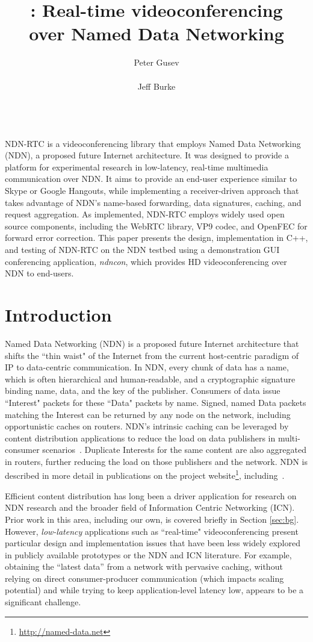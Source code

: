 \documentclass{icn/sig-alternate-2013} %
\title{\ndnrtcName{}: Real-time videoconferencing\\ over Named Data Networking}
\author{
\alignauthor Peter Gusev\\
       \affaddr{UCLA REMAP}\\
       \email{peter@remap.ucla.edu}
\alignauthor Jeff Burke\\
       \affaddr{UCLA REMAP}\\
       \email{jburke@remap.ucla.edu}
}
\newcommand{\ndnrtcName}{NDN-RTC} %
\newcommand{\ndnconName}{\emph{ndncon}}
\begin{document}
\maketitle

\abstract
\ndnrtcName{} is a videoconferencing library that employs Named Data Networking (NDN), a proposed future Internet architecture. It was designed to 
provide a platform for experimental research in low-latency, real-time multimedia communication over NDN. It aims to provide an end-user experience similar to Skype or Google Hangouts, while implementing a receiver-driven approach that takes advantage of NDN's name-based forwarding, data signatures, caching, and request aggregation.  As implemented, \ndnrtcName{} employs widely used open source components, including the WebRTC library, VP9 codec, and OpenFEC for forward error correction. This paper presents the design, implementation in C++, and testing of \ndnrtcName{} on the NDN testbed using a demonstration GUI conferencing application, \ndnconName{}, which provides HD videoconferencing over NDN to end-users. 
\section{Introduction}
Named Data Networking (NDN) is a proposed future Internet architecture that shifts the ``thin waist" of the Internet from the current host-centric paradigm of IP to data-centric communication. In NDN, every chunk of data has a name, which is often hierarchical and human-readable, and a cryptographic signature binding name, data, and the key of the publisher.  Consumers of data issue ``Interest" packets for these ``Data" packets by name. Signed, named Data packets matching the Interest can be returned by any node on the network, including opportunistic caches on routers. NDN's intrinsic caching can be leveraged by content distribution applications to reduce the load on data publishers in multi-consumer scenarios~\cite{ndnvideo}. Duplicate Interests for the same content are also aggregated in routers, further reducing the load on those publishers and the network. NDN is described in more detail in publications on the project website\footnote{\url{http://named-data.net}}, including~\cite{ndntechreport, ndntechreport0, ndn-netw}.

Efficient content distribution has long been a driver application for research on NDN research and the broader field of Information Centric Networking (ICN). Prior work in this area, including our own, is covered briefly in Section \ref{sec:bg}.  However, \emph{low-latency} applications such as ``real-time" videoconferencing present particular design and implementation issues that have been less widely explored in publicly available prototypes or the NDN and ICN literature. For example, obtaining the ``latest data'' from a network with pervasive caching, without relying on direct consumer-producer communication (which impacts scaling potential) and while trying to keep application-level latency low, appears to be a significant challenge.
\end{document}

